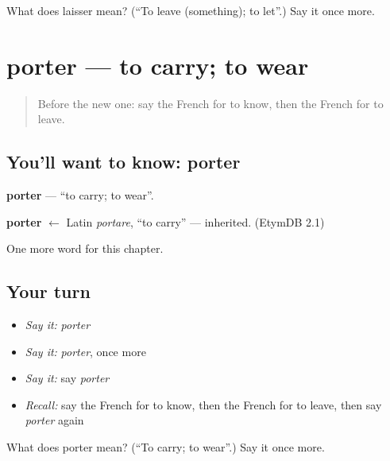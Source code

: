 \begin{tcolorbox}[breakable,colback=teal!4,colframe=teal!35!black,title={Before you move on}]
What does laisser mean? (\textquotedblleft{}To leave (something); to let\textquotedblright{}.) Say it once more.
\end{tcolorbox}
\section[porter]{porter — to carry; to wear}

\label{lesson:FR-C65-porter}



\begin{quote}
Before the new one: say the French for to know, then the French for to leave.
\end{quote}

\subsection*{You'll want to know: porter}
\textbf{porter} — \textquotedblleft{}to carry; to wear\textquotedblright{}.

\begin{cousinweb}
\textbf{porter} $\leftarrow$ Latin \emph{portare}, \textquotedblleft{}to carry\textquotedblright{} — inherited. (EtymDB 2.1)
\end{cousinweb}

\begin{grammarlens}[title={What you've built}]
One more word for this chapter.
\end{grammarlens}

\subsection*{Your turn}
\begin{itemize}
\raggedright
  \item \emph{Say it:} \emph{porter}
  \item \emph{Say it:} \emph{porter}, once more
  \item \emph{Say it:} say \emph{porter}
  \item \emph{Recall:} say the French for to know, then the French for to leave, then say \emph{porter} again
\end{itemize}

\begin{tcolorbox}[breakable,colback=teal!4,colframe=teal!35!black,title={Before you move on}]
What does porter mean? (\textquotedblleft{}To carry; to wear\textquotedblright{}.) Say it once more.
\end{tcolorbox}
